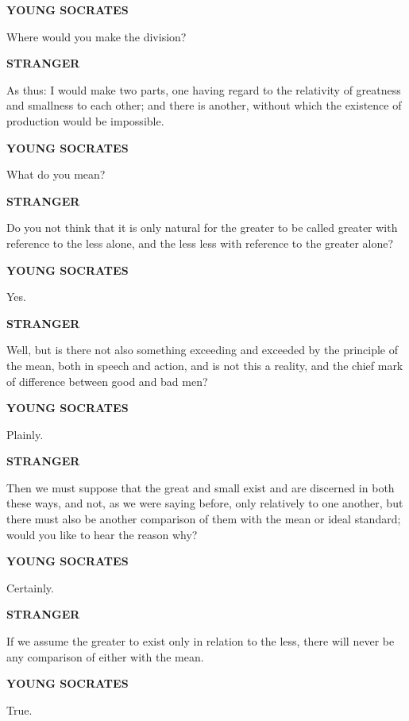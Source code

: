\documentclass[11pt,letter]{article}
\begin{document}
\par \textbf{YOUNG SOCRATES}
\par   Where would you make the division?

\par \textbf{STRANGER}
\par   As thus:  I would make two parts, one having regard to the relativity of greatness and smallness to each other; and there is another, without which the existence of production would be impossible.

\par \textbf{YOUNG SOCRATES}
\par   What do you mean?

\par \textbf{STRANGER}
\par   Do you not think that it is only natural for the greater to be called greater with reference to the less alone, and the less less with reference to the greater alone?

\par \textbf{YOUNG SOCRATES}
\par   Yes.

\par \textbf{STRANGER}
\par   Well, but is there not also something exceeding and exceeded by the principle of the mean, both in speech and action, and is not this a reality, and the chief mark of difference between good and bad men?

\par \textbf{YOUNG SOCRATES}
\par   Plainly.

\par \textbf{STRANGER}
\par   Then we must suppose that the great and small exist and are discerned in both these ways, and not, as we were saying before, only relatively to one another, but there must also be another comparison of them with the mean or ideal standard; would you like to hear the reason why?

\par \textbf{YOUNG SOCRATES}
\par   Certainly.

\par \textbf{STRANGER}
\par   If we assume the greater to exist only in relation to the less, there will never be any comparison of either with the mean.

\par \textbf{YOUNG SOCRATES}
\par   True.
\end{document}
